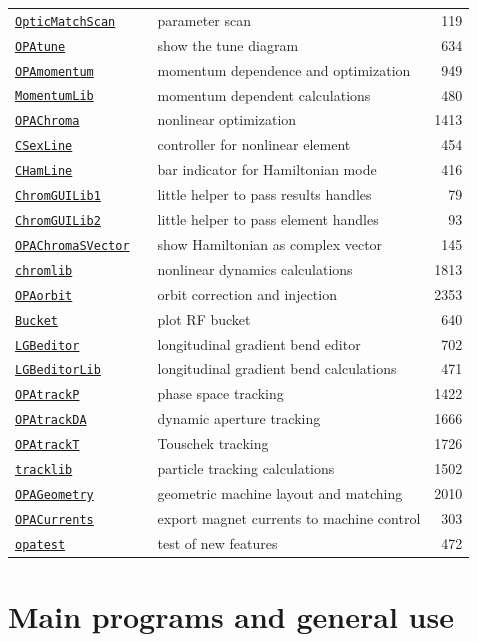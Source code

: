 \documentclass[12pt]{article}
\newcommand\code[1]{{\tt #1}}
\newcommand\guico[1]{{\color{blue}\code{#1}}}
\newcommand{\opagui}[1]{\colorbox{blue!20}{\code{#1}}}
\newcommand{\ogui}[1]{\hyperref[#1]{\opagui{#1}}}
\newcommand{\opaguif}[1]{\colorbox{violet!30}{\code{#1}}}
\newcommand{\oguif}[1]{\hyperref[#1]{\opaguif{#1}}}
\newcommand{\opauni}[1]{\colorbox{orange!30}{\code{#1}}}
\newcommand{\ouni}[1]{\hyperref[#1]{\opauni{#1}}}
\begin{document}
\begin{table}
{\begin{tabular}{lllr}
\ogui{OpticMatchScan} & \guico{TsetMatchScan}& parameter scan & 119 \\
\ogui{OPAtune} & \guico{TTunePlot} & show the tune diagram & 634 \\
\hline
\ogui{OPAmomentum} & \guico{} & momentum dependence and optimization & 949 \\
\ouni{MomentumLib} & \guico{} & momentum dependent calculations & 480 \\
\hline
\ogui{OPAChroma} & \guico{} & nonlinear optimization & 1413 \\
\oguif{CSexLine} & \guico{} & controller for nonlinear element & 454 \\
\oguif{CHamLine} & \guico{} & bar indicator for Hamiltonian mode & 416 \\
\ouni{ChromGUILib1} & & little helper to pass results handles & 79 \\
\ouni{ChromGUILib2} & & little helper to pass element handles & 93 \\
\ogui{OPAChromaSVector} & \guico{} & show Hamiltonian as complex vector & 145 \\
\ouni{chromlib} & & nonlinear dynamics calculations & 1813 \\
\hline
\ogui{OPAorbit} & \guico{} & orbit correction and injection & 2353 \\
\hline
\ogui{Bucket} & \guico{} & plot RF bucket & 640 \\
\ogui{LGBeditor} & \guico{} & longitudinal gradient bend editor & 702 \\
\ouni{LGBeditorLib} & & longitudinal gradient bend calculations & 471 \\
\hline
\ogui{OPAtrackP} & \guico{} & phase space tracking & 1422 \\
\ogui{OPAtrackDA} & \guico{} & dynamic aperture tracking & 1666 \\
\ogui{OPAtrackT} & \guico{} & Touschek tracking & 1726 \\
\ouni{tracklib} & & particle tracking calculations & 1502 \\
\hline
\ogui{OPAGeometry} & \guico{} & geometric machine layout and matching & 2010 \\
\ogui{OPACurrents} & \guico{} & export magnet currents to machine control & 303 \\
\ouni{opatest} & & test of new features & 472 
\end{tabular}
}
\end{table}

\pagebreak

\section{\label{secglob}Main programs and general use}
\end{document}

